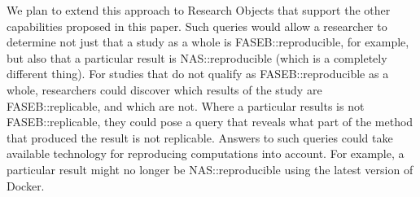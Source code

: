We plan to extend this approach to Research Objects that support the other capabilities
	proposed in this paper.
Such queries would allow a researcher to determine not just that a study as a whole
	is \textsf{FASEB::reproducible}, for example, but also that a particular result
	is \textsf{NAS::reproducible} (which is a completely different thing).
For studies that do not qualify as \textsf{FASEB::reproducible} as a whole, researchers
	could discover which results of the study are \textsf{FASEB::replicable}, and which are not.
Where a particular results is not \textsf{FASEB::replicable}, they could pose a query
	that reveals what part of the method that produced the result is
	not replicable.
Answers to such queries could take available technology for reproducing computations
	into account.
For example, a particular result might no longer be NAS::reproducible using the
	latest version of Docker.



